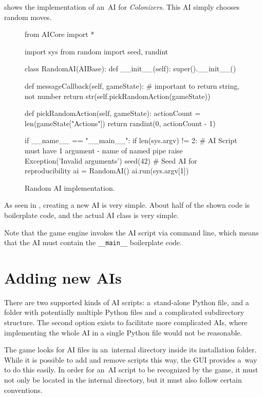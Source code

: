  shows the implementation of an~AI for \emph{Colonizers}.
This AI simply chooses random moves.

\begin{figure}[h!]
\begin{code}[commandchars=\\\{\},codes={\catcode`\$=3\catcode`\^=7\catcode`\_=8}]
from AICore import *

import sys
from random import seed, randint

class RandomAI(AIBase):
    def \_\_init\_\_(self):
        super().\_\_init\_\_()

    def messageCallback(self, gameState):
        # important to return string, not number
        return str(self.pickRandomAction(gameState))

    def pickRandomAction(self, gameState):
        actionCount = len(gameState["Actions"])
        return randint(0, actionCount - 1)

if \_\_name\_\_ == "\_\_main\_\_":
    if len(sys.argv) != 2:
        # AI Script must have 1 argument - name of named pipe
        raise Exception('Invalid arguments')
    seed(42) # Seed AI for reproducibility
    ai = RandomAI()
    ai.run(sys.argv[1])
\end{code}
\caption{Random AI implementation.}\label{framework:randomai}
\end{figure}

As seen in , creating a new AI is very simple.
About half of the shown code is boilerplate code, and the actual AI
class is very simple.

Note that the game engine invokes the AI script via command line, which
means that the AI must contain the \texttt{\_\_main\_\_} boilerplate code.

\section{Adding new AIs}

There are two supported kinds of AI scripts: a~stand-alone Python file,
and a folder with potentially multiple Python files and a complicated subdirectory
structure. The second option exists to facilitate more complicated AIs, where
implementing the whole AI in a single Python file would not be reasonable.

The game looks for AI files in an~internal directory inside its installation folder.
While it is possible to add and remove scripts this way, the GUI provides a~way
to do this easily. In order for an~AI script to be recognized by the game, it must not
only be located in the internal directory, but it must also follow certain conventions.

